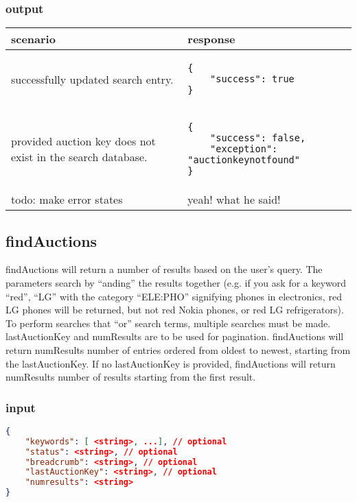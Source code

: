 \documentclass[12pt,a4paper]{article}
\begin{document}
\subsubsection{output}
\begin{center}
    \begin{tabular}{| p{5cm} | l |}
        \hline
        \textbf{scenario} & \textbf{response} \\
        \hline
        successfully updated search entry. &
        \begin{lstlisting}[boxpos=t,language=tablejson,firstnumber=1]
{
    "success": true
}
        \end{lstlisting} \\ 
        \hline
        provided auction key does not exist in the search database. & 
        \begin{lstlisting}[boxpos=t,language=tablejson,firstnumber=1]
{
    "success": false,
    "exception": "auctionkeynotfound"
}
        \end{lstlisting} \\
        \hline
            todo: make error states & yeah! what he said! \\
        \hline
    \end{tabular}
\end{center}


\subsection{findAuctions}
findAuctions will return a number of results based on the user's query. The
parameters search by ``anding'' the results together (e.g. if you ask for a
keyword ``red'', ``LG'' with the category ``ELE:PHO'' signifying phones in
electronics, red LG phones will be returned, but not red Nokia phones, or red
LG refrigerators). To perform searches that ``or'' search terms, multiple
searches must be made. lastAuctionKey and numResults are to be used for
pagination. findAuctions will return numResults number of entries ordered from
oldest to newest, starting from the lastAuctionKey. If no lastAuctionKey is
provided, findAuctions will return numResults number of results starting from
the first result.

\subsubsection{input}
\begin{lstlisting}[language=json,firstnumber=1]
{
    "keywords": [ <string>, ...], // optional
    "status": <string>, // optional
    "breadcrumb": <string>, // optional
    "lastAuctionKey": <string>, // optional
    "numresults": <string>
}
\end{lstlisting}
\end{document}
